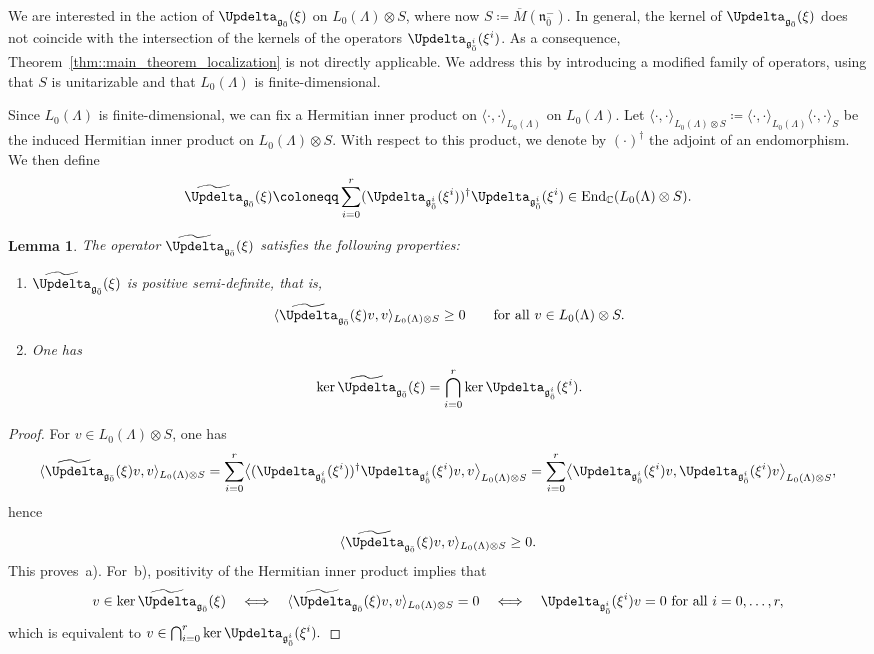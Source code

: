 \documentclass[11pt]{amsart}
\newcommand{\End}{\operatorname{End}}
\def\CC{{\mathbb C}}
\def\even{{\mathfrak{g}_{\bar{0}}}}
\def\nn {{\mathfrak{n}}}
\def\gg{{\mathfrak{g}}}
\theoremstyle{plain}
\newtheorem{lemma}[theorem]{Lemma}
\theoremstyle{remark}
\theoremstyle{definition}
\numberwithin{equation}{section}
\theoremstyle{remark}
\begin{document}
We are interested in the action of $\Updelta_{\even}(\xi)$ on $L_{0}(\Lambda)\otimes S$, where now $S\coloneqq \overline{M}(\nn_{\bar{0}}^{-})$. In general, the kernel of $\Updelta_{\even}(\xi)$ does not coincide with the intersection of the kernels of the operators $\Updelta_{\gg_{\bar 0}^{i}}(\xi^{i})$. As a consequence, Theorem~\ref{thm::main_theorem_localization} is not directly applicable. We address this by introducing a modified family of operators, using that $S$ is unitarizable and that $L_{0}(\Lambda)$ is finite-dimensional.


Since $L_{0}(\Lambda)$ is finite-dimensional, we can fix a Hermitian inner product on $\langle \cdot,\cdot\rangle_{L_{0}(\Lambda)}$ on $L_{0}(\Lambda)$. Let $\langle \cdot,\cdot\rangle_{L_{0}(\Lambda)\otimes S}\coloneqq \langle \cdot,\cdot\rangle_{L_{0}(\Lambda)}\langle\cdot,\cdot\rangle_{S}$ be the induced Hermitian inner product on $L_{0}(\Lambda)\otimes S$. With respect to this product, we denote by $(\cdot)^{\dagger}$ the adjoint of an endomorphism. We then define 
\begin{equation}
 \widetilde{\Updelta}_{\even}(\xi)\coloneqq \sum_{i=0}^{r}(\Updelta_{\gg_{\bar{0}}^{i}}(\xi^{i}))^{\dagger}\Updelta_{\gg_{\bar{0}}^{i}}(\xi^{i}) \in \End_{\CC}(L_{0}(\Lambda)\otimes S).
\end{equation}

\begin{lemma} \label{lemm::properties_generalized_Laplace}
The operator $\widetilde{\Updelta}_{\even}(\xi)$ satisfies the following properties:
\begin{enumerate}
 \item[a)] $\widetilde{\Updelta}_{\even}(\xi)$ is positive semi-definite, that is,
 \[
 \langle \widetilde{\Updelta}_{\even}(\xi)v,v\rangle_{L_{0}(\Lambda)\otimes S}\geq 0
 \qquad\text{for all } v\in L_{0}(\Lambda)\otimes S.
 \]
 \item[b)] One has
 \[
 \ker \widetilde{\Updelta}_{\even}(\xi)=\bigcap_{i=0}^{r}\ker \Updelta_{\gg_{\bar 0}^{i}}(\xi^{i}).
 \]
\end{enumerate}
\end{lemma}

\begin{proof}
For $v\in L_{0}(\Lambda)\otimes S$, one has
\[
\langle \widetilde{\Updelta}_{\even}(\xi)v,v\rangle_{L_{0}(\Lambda)\otimes S}
=\sum_{i=0}^{r}\bigl\langle (\Updelta_{\gg_{\bar 0}^{i}}(\xi^{i}))^{\dagger}\Updelta_{\gg_{\bar 0}^{i}}(\xi^{i})v,v\bigr\rangle_{L_{0}(\Lambda)\otimes S}
=\sum_{i=0}^{r}\bigl\langle \Updelta_{\gg_{\bar 0}^{i}}(\xi^{i})v,\Updelta_{\gg_{\bar 0}^{i}}(\xi^{i})v\bigr\rangle_{L_{0}(\Lambda)\otimes S},
\]
hence
\[
\langle \widetilde{\Updelta}_{\even}(\xi)v,v\rangle_{L_{0}(\Lambda)\otimes S}\geq 0.
\]
This proves~\textup{a)}. For~\textup{b)}, positivity of the Hermitian inner product implies that
\[
v\in \ker \widetilde{\Updelta}_{\even}(\xi)
\quad\Longleftrightarrow\quad
\langle \widetilde{\Updelta}_{\even}(\xi)v,v\rangle_{L_{0}(\Lambda)\otimes S}=0
\quad\Longleftrightarrow\quad
\Updelta_{\gg_{\bar 0}^{i}}(\xi^{i})v=0 \text{ for all } i=0,\ldots,r,
\]
which is equivalent to
$
v\in \bigcap_{i=0}^{r}\ker \Updelta_{\gg_{\bar 0}^{i}}(\xi^{i}).
$
\end{proof}
\end{document}
